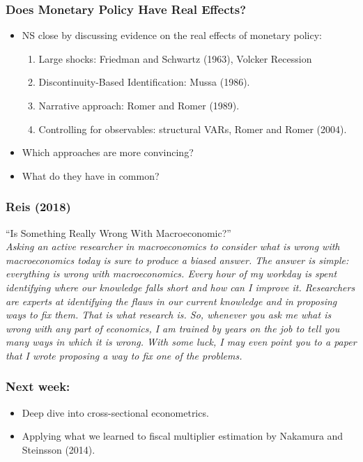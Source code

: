 \documentclass[english,xcolor=svgnames]{beamer}
\begin{document}
\begin{frame}
\frametitle[alignment=center]{Does Monetary Policy Have Real Effects?}
\begin{itemize}
	\item NS close by discussing evidence on the real effects of monetary policy:
	\begin{enumerate}
		\item Large shocks: Friedman and Schwartz (1963), Volcker Recession
		\item Discontinuity-Based Identification: Mussa (1986).
		\item Narrative approach: Romer and Romer (1989).
		\item Controlling for observables: structural VARs, Romer and Romer (2004).
	\end{enumerate}
	\item Which approaches are more convincing?
	\item What do they have in common?
\end{itemize}
\end{frame}


\begin{frame}
\frametitle[alignment=center]{Reis (2018)}
``Is Something Really Wrong With Macroeconomic?''\\
$\;$\\
\emph{Asking an active researcher in macroeconomics to consider what is wrong with macroeconomics today is sure to produce a biased answer. The answer is simple: everything is wrong with macroeconomics. Every hour of my workday is spent identifying where our knowledge falls short and how can I improve it. Researchers are experts at identifying the flaws in our current knowledge and in proposing ways to fix them. That is what research is. So, whenever you ask me what is wrong with any part of economics, I am trained by years on the job to tell you many ways in which it is wrong. With some luck, I may even point you to a paper that I wrote proposing a way to fix one of the problems.}
\end{frame}





\begin{frame}
\frametitle[alignment=center]{Next week:}
\begin{itemize}
	\item Deep dive into cross-sectional econometrics.
	\item Applying what we learned to fiscal multiplier estimation by Nakamura and Steinsson (2014).
\end{itemize}
\end{frame}
\end{document}
